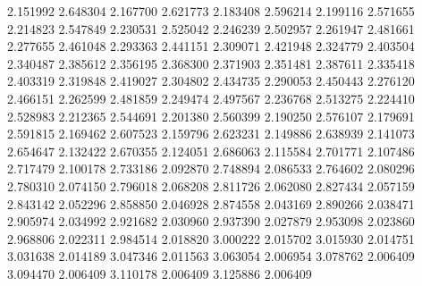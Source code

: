 2.151992	2.648304 
2.167700	2.621773 
2.183408	2.596214 
2.199116	2.571655 
2.214823	2.547849 
2.230531	2.525042 
2.246239	2.502957 
2.261947	2.481661 
2.277655	2.461048 
2.293363	2.441151 
2.309071	2.421948 
2.324779	2.403504 
2.340487	2.385612 
2.356195	2.368300 
2.371903	2.351481 
2.387611	2.335418 
2.403319	2.319848 
2.419027	2.304802 
2.434735	2.290053 
2.450443	2.276120 
2.466151	2.262599 
2.481859	2.249474 
2.497567	2.236768 
2.513275	2.224410 
2.528983	2.212365 
2.544691	2.201380 
2.560399	2.190250 
2.576107	2.179691 
2.591815	2.169462 
2.607523	2.159796 
2.623231	2.149886 
2.638939	2.141073 
2.654647	2.132422 
2.670355	2.124051 
2.686063	2.115584 
2.701771	2.107486 
2.717479	2.100178 
2.733186	2.092870 
2.748894	2.086533 
2.764602	2.080296 
2.780310	2.074150 
2.796018	2.068208 
2.811726	2.062080 
2.827434	2.057159 
2.843142	2.052296 
2.858850	2.046928 
2.874558	2.043169 
2.890266	2.038471 
2.905974	2.034992 
2.921682	2.030960 
2.937390	2.027879 
2.953098	2.023860 
2.968806	2.022311 
2.984514	2.018820 
3.000222	2.015702 
3.015930	2.014751 
3.031638	2.014189 
3.047346	2.011563 
3.063054	2.006954 
3.078762	2.006409 
3.094470	2.006409 
3.110178	2.006409 
3.125886	2.006409 
